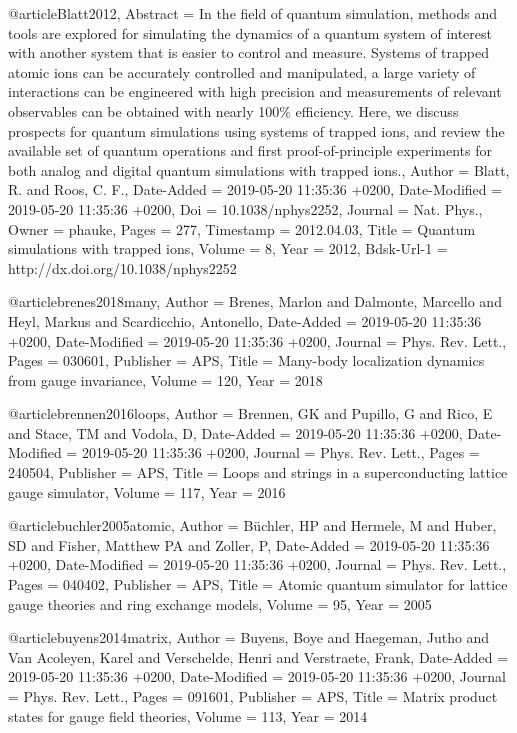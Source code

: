 \documentclass[epj,final]{svjour}
\begin{document}
@article{Blatt2012,
	Abstract = {In the field of quantum simulation, methods and tools are explored for simulating the dynamics of a quantum system of interest with another system that is easier to control and measure. Systems of trapped atomic ions can be accurately controlled and manipulated, a large variety of interactions can be engineered with high precision and measurements of relevant observables can be obtained with nearly 100\% efficiency. Here, we discuss prospects for quantum simulations using systems of trapped ions, and review the available set of quantum operations and first proof-of-principle experiments for both analog and digital quantum simulations with trapped ions.},
	Author = {Blatt, R. and Roos, C. F.},
	Date-Added = {2019-05-20 11:35:36 +0200},
	Date-Modified = {2019-05-20 11:35:36 +0200},
	Doi = {10.1038/nphys2252},
	Journal = {Nat. Phys.},
	Owner = {phauke},
	Pages = {277},
	Timestamp = {2012.04.03},
	Title = {{Quantum simulations with trapped ions}},
	Volume = {8},
	Year = {2012},
	Bdsk-Url-1 = {http://dx.doi.org/10.1038/nphys2252}}

@article{brenes2018many,
	Author = {Brenes, Marlon and Dalmonte, Marcello and Heyl, Markus and Scardicchio, Antonello},
	Date-Added = {2019-05-20 11:35:36 +0200},
	Date-Modified = {2019-05-20 11:35:36 +0200},
	Journal = {Phys. Rev. Lett.},
	Pages = {030601},
	Publisher = {APS},
	Title = {Many-body localization dynamics from gauge invariance},
	Volume = {120},
	Year = {2018}}

@article{brennen2016loops,
	Author = {Brennen, GK and Pupillo, G and Rico, E and Stace, TM and Vodola, D},
	Date-Added = {2019-05-20 11:35:36 +0200},
	Date-Modified = {2019-05-20 11:35:36 +0200},
	Journal = {Phys. Rev. Lett.},
	Pages = {240504},
	Publisher = {APS},
	Title = {Loops and strings in a superconducting lattice gauge simulator},
	Volume = {117},
	Year = {2016}}

@article{buchler2005atomic,
	Author = {B{\"u}chler, HP and Hermele, M and Huber, SD and Fisher, Matthew PA and Zoller, P},
	Date-Added = {2019-05-20 11:35:36 +0200},
	Date-Modified = {2019-05-20 11:35:36 +0200},
	Journal = {Phys. Rev. Lett.},
	Pages = {040402},
	Publisher = {APS},
	Title = {Atomic quantum simulator for lattice gauge theories and ring exchange models},
	Volume = {95},
	Year = {2005}}

@article{buyens2014matrix,
	Author = {Buyens, Boye and Haegeman, Jutho and Van Acoleyen, Karel and Verschelde, Henri and Verstraete, Frank},
	Date-Added = {2019-05-20 11:35:36 +0200},
	Date-Modified = {2019-05-20 11:35:36 +0200},
	Journal = {Phys. Rev. Lett.},
	Pages = {091601},
	Publisher = {APS},
	Title = {Matrix product states for gauge field theories},
	Volume = {113},
	Year = {2014}}
\end{document}
